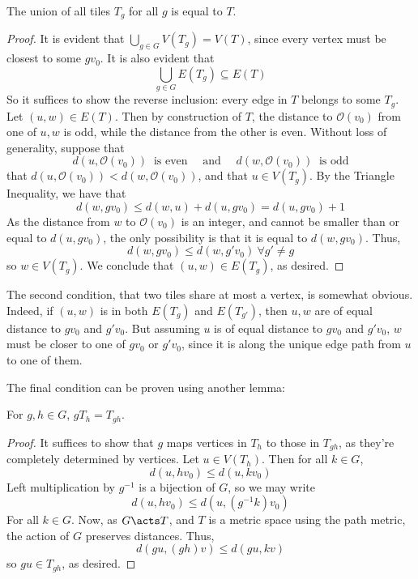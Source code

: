 \begin{lemma}\label{T_g's cover T}
    The union of all tiles $T_g$ for all $g$ is equal to $T$. 
\end{lemma}

\begin{proof}
    It is evident that $\bigcup_{g\in G}V(T_g) = V(T)$, since every vertex must be closest to some $gv_0$. It is also evident that
    \[ \bigcup_{g \in G}E(T_g) \subseteq E(T) \]
    So it suffices to show the reverse inclusion: every edge in $T$ belongs to some $T_g$. Let $(u,w) \in E(T)$. Then by construction of $T$, the distance to $\mathcal{O}(v_0)$ from one of $u,w$ is odd, while the distance from the other is even. Without loss of generality, suppose that
    \[
    d(u,\mathcal{O}(v_0)) \ \text{ is even} \quad \text{ and } \quad d(w,\mathcal{O}(v_0)) \ \text{ is odd}
    \]
    that $d(u,\mathcal{O}(v_0)) < d(w,\mathcal{O}(v_0))$, and that $u \in V(T_g)$. By the Triangle Inequality, we have that 
    \[
    d(w,gv_0) \leq d(w,u) +  d(u,gv_0) = d(u,gv_0) + 1
    \]
    As the distance from $w$ to $\mathcal{O}(v_0)$ is an integer, and cannot be smaller than or equal to $d(u,gv_0)$, the only possibility is that it is equal to $d(w,gv_0)$. Thus, 
    \[ d(w,gv_0) \leq d(w,g'v_0) \ \forall g' \neq g \]
    so $w \in V(T_g)$. We conclude that $(u,w) \in E(T_g)$, as desired. 
\end{proof}

The second condition, that two tiles share at most a vertex, is somewhat obvious. Indeed, if $(u,w)$ is in both $E(T_g)$ and $E(T_{g'})$, then $u,w$ are of equal distance to $gv_0$ and $g'v_0$. But assuming $u$ is of equal distance to $gv_0$ and $g'v_0$, $w$ must be closer to one of $gv_0$ or $g'v_0$, since it is along the unique edge path from $u$ to one of them. 

The final condition can be proven using another lemma: 

\begin{lemma}\label{gT_h = T_gh}
    For $g,h \in G$, $gT_h = T_{gh}$.
\end{lemma}

\begin{proof}
    It suffices to show that $g$ maps vertices in $T_h$ to those in $T_{gh}$, as they're completely determined by vertices. Let $u \in V(T_h)$. Then for all $k \in G$,
    \[
    d(u,hv_0) \leq d(u,kv_0)
    \]
    Left multiplication by $g^{-1}$ is a bijection of $G$, so we may write 
    \[
    d(u,hv_0) \leq d(u,(g^{-1}k)v_0)
    \]
    For all $k \in G$. Now, as $G \acts T$, and $T$ is a metric space using the path metric, the action of $G$ preserves distances. Thus,
    \[
    d(gu, (gh)v) \leq d(gu,kv)
    \]
    so $gu \in T_{gh}$, as desired. 
\end{proof}

